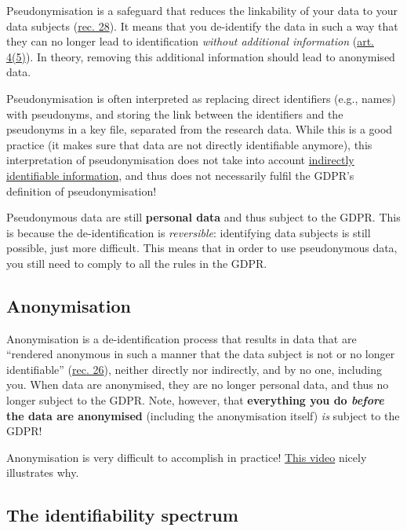 \documentclass[
]{book}
\begin{document}
Pseudonymisation is a safeguard that reduces the linkability of your data to
your data subjects (\href{https://gdpr-info.eu/recitals/no-28/}{rec. 28}).
It means that you de-identify the data in such a way that they can no longer
lead to identification \emph{without additional information}
(\href{https://gdpr-info.eu/art-4-gdpr/}{art. 4(5)}). In theory,
removing this additional information should lead to anonymised data.

Pseudonymisation is often interpreted as replacing direct
identifiers (e.g., names) with pseudonyms, and storing the link between the
identifiers and the pseudonyms in a key file, separated from the research data.
While this is a good practice (it makes sure that data are not directly
identifiable anymore), this interpretation of pseudonymisation does not take
into account \protect\hyperlink{when-anonymous}{indirectly identifiable information}, and thus
does not necessarily fulfil the GDPR's definition of pseudonymisation!

Pseudonymous data are still \textbf{personal data} and thus subject to the GDPR. This
is because the de-identification is \emph{reversible}: identifying data subjects is
still possible, just more difficult. This means that in order to use
pseudonymous data, you still need to comply to all the rules in the GDPR.

\hypertarget{anonymisation}{%
\subsection{Anonymisation}\label{anonymisation}}

Anonymisation is a de-identification process that results in data that are
``rendered anonymous in such a manner that the data subject is not or no longer
identifiable'' (\href{https://gdpr-info.eu/recitals/no-26/}{rec. 26}),
neither directly nor indirectly, and by no one, including you. When data are
anonymised, they are no longer personal data, and thus no longer subject to the
GDPR. Note, however, that \textbf{everything you do \emph{before} the data are anonymised}
(including the anonymisation itself) \emph{is} subject to the GDPR!

Anonymisation is very difficult to accomplish in practice!
\href{https://www.youtube.com/watch?v=puQvpyf0W-M}{This video}
nicely illustrates why.

\hypertarget{identifiability-spectrum}{%
\subsection{The identifiability spectrum}\label{identifiability-spectrum}}
\end{document}
